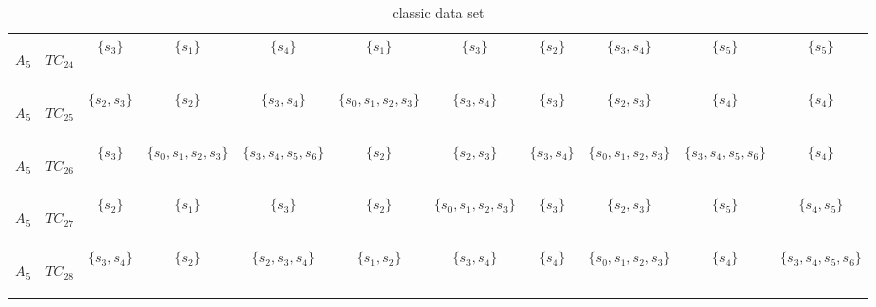 \begin{table}[htp]
\begin{center}
\begin{tabular}{|cc|c|c|c|c|c|c|c|c|c|}
\begin{scriptsize}$A_5$\end{scriptsize} & \begin{scriptsize}$TC_{24}$\end{scriptsize} & $\{s_3\}$ & $\{s_1\}$ & $\{s_4\}$ & $\{s_1\}$ & $\{s_3\}$ & $\{s_2\}$ & $\{s_3, s_4\}$ & $\{s_5\}$ & $\{s_5\}$\\
\begin{scriptsize}$A_5$\end{scriptsize} & \begin{scriptsize}$TC_{25}$\end{scriptsize} & $\{s_2, s_3\}$ & $\{s_2\}$ & $\{s_3, s_4\}$ & $\{s_0, s_1, s_2, s_3\}$ & $\{s_3, s_4\}$ & $\{s_3\}$ & $\{s_2, s_3\}$ & $\{s_4\}$ & $\{s_4\}$\\
\begin{scriptsize}$A_5$\end{scriptsize} & \begin{scriptsize}$TC_{26}$\end{scriptsize} & $\{s_3\}$ & $\{s_0, s_1, s_2, s_3\}$ & $\{s_3, s_4, s_5, s_6\}$ & $\{s_2\}$ & $\{s_2, s_3\}$ & $\{s_3, s_4\}$ & $\{s_0, s_1, s_2, s_3\}$ & $\{s_3, s_4, s_5, s_6\}$ & $\{s_4\}$\\
\begin{scriptsize}$A_5$\end{scriptsize} & \begin{scriptsize}$TC_{27}$\end{scriptsize} & $\{s_2\}$ & $\{s_1\}$ & $\{s_3\}$ & $\{s_2\}$ & $\{s_0, s_1, s_2, s_3\}$ & $\{s_3\}$ & $\{s_2, s_3\}$ & $\{s_5\}$ & $\{s_4, s_5\}$\\
\begin{scriptsize}$A_5$\end{scriptsize} & \begin{scriptsize}$TC_{28}$\end{scriptsize} & $\{s_3, s_4\}$ & $\{s_2\}$ & $\{s_2, s_3, s_4\}$ & $\{s_1, s_2\}$ & $\{s_3, s_4\}$ & $\{s_4\}$ & $\{s_0, s_1, s_2, s_3\}$ & $\{s_4\}$ & $\{s_3, s_4, s_5, s_6\}$\\
\hline \hline
\end{tabular}
\end{center}
\caption{classic data set}
\label{classic}
\end{table}